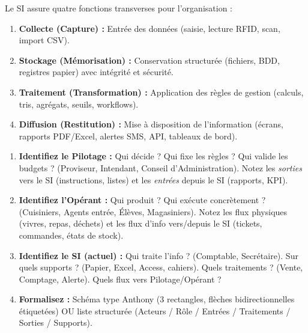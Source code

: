 \documentclass[11pt]{article}
\begin{document}
\begin{propriete}
Le SI assure quatre fonctions transverses pour l'organisation :
\begin{enumerate}
    \item \textbf{Collecte (Capture) :} Entrée des données (saisie, lecture RFID, scan, import CSV).
    \item \textbf{Stockage (Mémorisation) :} Conservation structurée (fichiers, BDD, registres papier) avec intégrité et sécurité.
    \item \textbf{Traitement (Transformation) :} Application des règles de gestion (calculs, tris, agrégats, seuils, workflows).
    \item \textbf{Diffusion (Restitution) :} Mise à disposition de l'information (écrans, rapports PDF/Excel, alertes SMS, API, tableaux de bord).
\end{enumerate}
\end{propriete}

\begin{methode}
\begin{enumerate}
    \item \textbf{Identifiez le Pilotage :} Qui décide ? Qui fixe les règles ? Qui valide les budgets ? (Proviseur, Intendant, Conseil d'Administration). Notez les \emph{sorties} vers le SI (instructions, listes) et les \emph{entrées} depuis le SI (rapports, KPI).
    \item \textbf{Identifiez l'Opérant :} Qui produit ? Qui exécute concrètement ? (Cuisiniers, Agents entrée, Élèves, Magasiniers). Notez les flux physiques (vivres, repas, déchets) et les flux d'info vers/depuis le SI (tickets, commandes, états de stock).
    \item \textbf{Identifiez le SI (actuel) :} Qui traite l'info ? (Comptable, Secrétaire). Sur quels supports ? (Papier, Excel, Access, cahiers). Quels traitements ? (Vente, Comptage, Alerte). Quels flux vers Pilotage/Opérant ?
    \item \textbf{Formalisez :} Schéma type Anthony (3 rectangles, flèches bidirectionnelles étiquetées) OU liste structurée (Acteurs / Rôle / Entrées / Traitements / Sorties / Supports).
\end{enumerate}
\end{methode}
\end{document}
